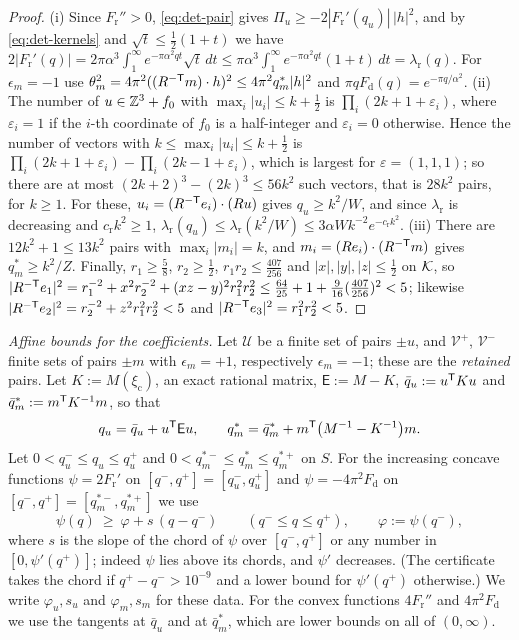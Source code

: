 \begin{proof}
(i) Since $F_{\mathrm r}''>0$, \eqref{eq:det-pair} gives $\Pi_u\ge-2|F_{\mathrm r}'(q_u)|\,|h|^2$, and by \eqref{eq:det-kernels} and
$\sqrt t\le\frac12(1+t)$ we have
$2|F_{\mathrm r}'(q)|=2\pi\alpha^3\int_1^\infty e^{-\pi\alpha^2qt}\sqrt t\,dt\le\pi\alpha^3\int_1^\infty e^{-\pi\alpha^2qt}(1+t)\,dt=\lambda_{\mathrm r}(q)$.
For $\epsilon_m=-1$ use $\theta_m^2=4\pi^2((R^{-\mathsf T}m)\cdot h)^2\le4\pi^2q_m^*|h|^2$ and $\pi qF_{\mathrm d}(q)=e^{-\pi q/\alpha^2}$.
(ii) The number of $u\in\mathbb Z^3+f_0$ with $\max_i|u_i|\le k+\frac12$ is $\prod_i(2k+1+\varepsilon_i)$, where $\varepsilon_i=1$ if the
$i$-th coordinate of $f_0$ is a half-integer and $\varepsilon_i=0$ otherwise. Hence the number of vectors with
$k\le\max_i|u_i|\le k+\frac12$ is $\prod_i(2k+1+\varepsilon_i)-\prod_i(2k-1+\varepsilon_i)$, which is largest for
$\varepsilon=(1,1,1)$; so there are at most $(2k+2)^3-(2k)^3\le56k^2$ such vectors, that is $28k^2$ pairs, for $k\ge1$. For these,
$u_i=(R^{-\mathsf T}e_i)\cdot(Ru)$ gives $q_u\ge k^2/W$, and since $\lambda_{\mathrm r}$ is decreasing and $c_{\mathrm r}k^2\ge1$,
$\lambda_{\mathrm r}(q_u)\le\lambda_{\mathrm r}(k^2/W)\le3\alpha Wk^{-2}e^{-c_{\mathrm r}k^2}$.
(iii) There are $12k^2+1\le13k^2$ pairs with $\max_i|m_i|=k$, and $m_i=(Re_i)\cdot(R^{-\mathsf T}m)$ gives $q_m^*\ge k^2/Z$.
Finally, $r_1\ge\frac58$, $r_2\ge\frac12$, $r_1r_2\le\frac{407}{256}$ and $|x|,|y|,|z|\le\frac12$ on $\mathcal K$, so
$|R^{-\mathsf T}e_1|^2=r_1^{-2}+x^2r_2^{-2}+(xz-y)^2r_1^2r_2^2\le\frac{64}{25}+1+\frac9{16}(\frac{407}{256})^2<5$; likewise
$|R^{-\mathsf T}e_2|^2=r_2^{-2}+z^2r_1^2r_2^2<5$ and $|R^{-\mathsf T}e_3|^2=r_1^2r_2^2<5$.
\end{proof}

\emph{Affine bounds for the coefficients.} Let $\mathcal U$ be a finite set of pairs $\pm u$, and $\mathcal V^+$, $\mathcal V^-$ finite
sets of pairs $\pm m$ with $\epsilon_m=+1$, respectively $\epsilon_m=-1$; these are the \emph{retained} pairs. Let
$K:=M(\xi_{\mathrm c})$, an exact rational matrix, $\mathsf E:=M-K$, $\bar q_u:=u^\mathsf T Ku$ and $\bar q^*_m:=m^\mathsf T K^{-1}m$, so that
\begin{equation}\label{eq:det-shift}
  q_u=\bar q_u+u^\mathsf T\mathsf Eu,\qquad q^*_m=\bar q^*_m+m^\mathsf T\bigl(M^{-1}-K^{-1}\bigr)m .
\end{equation}
Let $0<q_u^-\le q_u\le q_u^+$ and $0<q_m^{*-}\le q_m^*\le q_m^{*+}$ on $S$. For the increasing concave functions
$\psi=2F_{\mathrm r}'$ on $[q^-,q^+]=[q_u^-,q_u^+]$ and $\psi=-4\pi^2F_{\mathrm d}$ on $[q^-,q^+]=[q_m^{*-},q_m^{*+}]$ we use
\begin{equation}\label{eq:det-secant}
  \psi(q)\ \ge\ \varphi+s\,(q-q^-)\qquad(q^-\le q\le q^+),\qquad \varphi:=\psi(q^-),
\end{equation}
where $s$ is the slope of the chord of $\psi$ over $[q^-,q^+]$ or any number in $[0,\psi'(q^+)]$; indeed $\psi$ lies above its chords,
and $\psi'$ decreases. (The certificate takes the chord if $q^+-q^->10^{-9}$ and a lower bound for $\psi'(q^+)$ otherwise.) We
write $\varphi_u,s_u$ and $\varphi_m,s_m$ for these data. For the convex functions $4F_{\mathrm r}''$ and $4\pi^2F_{\mathrm d}$ we use
the tangents at $\bar q_u$ and at $\bar q_m^*$, which are lower bounds on all of $(0,\infty)$.

